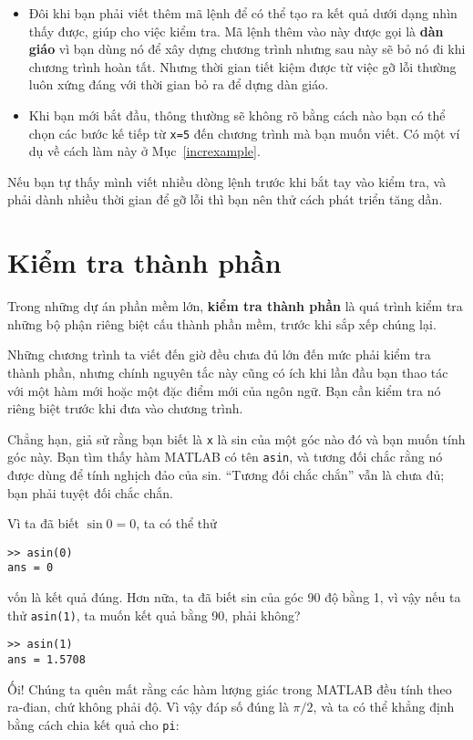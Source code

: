 \documentclass[12pt]{book}
\begin{document}
\begin{itemize}

\item Đôi khi bạn phải viết thêm mã lệnh để có thể tạo ra kết quả
dưới dạng nhìn thấy được, giúp cho việc kiểm tra. Mã lệnh thêm vào
này được gọi là {\bf dàn giáo} vì bạn dùng nó để xây dựng chương trình
nhưng sau này sẽ bỏ nó đi khi chương trình hoàn tất. Nhưng thời gian
tiết kiệm được từ việc gỡ lỗi thường luôn xứng đáng với thời gian
bỏ ra để dựng dàn giáo.

\item Khi bạn mới bắt đầu, thông thường sẽ không rõ bằng cách nào
bạn có thể chọn các bước kế tiếp từ {\tt x=5} đến chương trình mà
bạn muốn viết. Có một ví dụ về cách làm này ở Mục~\ref{increxample}.

\end{itemize}

Nếu bạn tự thấy mình viết nhiều dòng lệnh trước khi bắt tay vào 
kiểm tra, và phải dành nhiều thời gian để gỡ lỗi thì bạn nên thử
cách phát triển tăng dần.


\section{Kiểm tra thành phần}

Trong những dự án phần mềm lớn, {\bf kiểm tra thành phần} là 
quá trình kiểm tra những bộ phận riêng biệt cấu thành phần mềm,
trước khi sắp xếp chúng lại.

Những chương trình ta viết đến giờ đều chưa đủ lớn đến mức phải
kiểm tra thành phần, nhưng chính nguyên tắc này cũng có ích khi
lần đầu bạn thao tác với một hàm mới hoặc một đặc điểm mới của 
ngôn ngữ. Bạn cần kiểm tra nó riêng biệt trước khi đưa vào 
chương trình.

Chẳng hạn, giả sử rằng bạn biết là {\tt x} là sin của một góc nào đó
và bạn muốn tính góc này. Bạn tìm thấy hàm MATLAB có tên {\tt asin},
và tương đối chắc rằng nó được dùng để tính nghịch đảo của sin.
``Tương đối chắc chắn'' vẫn là chưa đủ; bạn phải tuyệt đối chắc
chắn.

Vì ta đã biết $\sin 0 = 0$, ta có thể thử

\begin{verbatim}
>> asin(0)
ans = 0
\end{verbatim}
%
\noindent vốn là kết quả đúng. Hơn nữa, ta đã biết sin của góc 90 độ 
bằng 1, vì vậy nếu ta thử {\tt asin(1)}, ta muốn kết quả bằng 90, 
phải không?

\begin{verbatim}
>> asin(1)
ans = 1.5708
\end{verbatim}
%
Ối! Chúng ta quên mất rằng các hàm lượng giác trong MATLAB đều 
tính theo ra-đian, chứ không phải độ. Vì vậy đáp số đúng là $\pi/2$, 
và ta có thể khẳng định bằng cách chia kết quả cho {\tt pi}:
\end{document}
